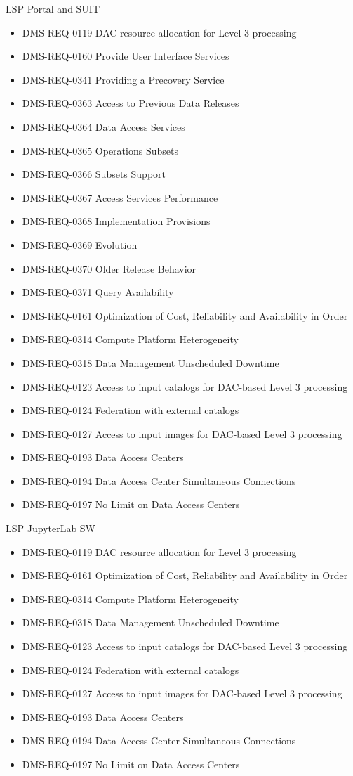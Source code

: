 LSP Portal and SUIT \begin{itemize}
\item DMS-REQ-0119 DAC resource allocation for Level 3 processing
\item DMS-REQ-0160 Provide User Interface Services
\item DMS-REQ-0341 Providing a Precovery Service
\item DMS-REQ-0363 Access to Previous Data Releases
\item DMS-REQ-0364 Data Access Services
\item DMS-REQ-0365 Operations Subsets
\item DMS-REQ-0366 Subsets Support
\item DMS-REQ-0367 Access Services Performance
\item DMS-REQ-0368 Implementation Provisions
\item DMS-REQ-0369 Evolution
\item DMS-REQ-0370 Older Release Behavior
\item DMS-REQ-0371 Query Availability
\item DMS-REQ-0161 Optimization of Cost, Reliability and Availability in Order
\item DMS-REQ-0314 Compute Platform Heterogeneity
\item DMS-REQ-0318 Data Management Unscheduled Downtime
\item DMS-REQ-0123 Access to input catalogs for DAC-based Level 3 processing
\item DMS-REQ-0124 Federation with external catalogs
\item DMS-REQ-0127 Access to input images for DAC-based Level 3 processing
\item DMS-REQ-0193 Data Access Centers
\item DMS-REQ-0194 Data Access Center Simultaneous Connections
\item DMS-REQ-0197 No Limit on Data Access Centers
\end{itemize}
LSP JupyterLab SW \begin{itemize}
\item DMS-REQ-0119 DAC resource allocation for Level 3 processing
\item DMS-REQ-0161 Optimization of Cost, Reliability and Availability in Order
\item DMS-REQ-0314 Compute Platform Heterogeneity
\item DMS-REQ-0318 Data Management Unscheduled Downtime
\item DMS-REQ-0123 Access to input catalogs for DAC-based Level 3 processing
\item DMS-REQ-0124 Federation with external catalogs
\item DMS-REQ-0127 Access to input images for DAC-based Level 3 processing
\item DMS-REQ-0193 Data Access Centers
\item DMS-REQ-0194 Data Access Center Simultaneous Connections
\item DMS-REQ-0197 No Limit on Data Access Centers
\end{itemize}
